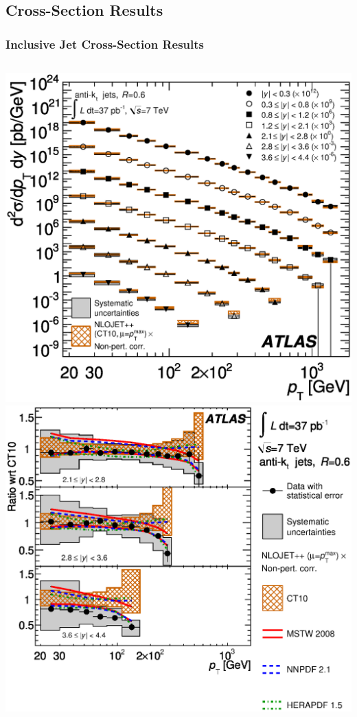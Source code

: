 \documentclass[10pt]{beamer}
\begin{document}
\subsection{Cross-Section Results}
\begin{frame}\frametitle{Inclusive Jet Cross-Section Results}
\begin{columns}
\includegraphics[width=0.95\linewidth,angle=0]{inclusive_results/figs_new/fig_10_inc_cross_section_akt6.eps}
\includegraphics[width=0.95\linewidth,angle=0]{inclusive_results/figs_new/fig_12d_inc_ratio_akt6_forward.eps}%

\end{columns}
\end{frame}
\end{document}
